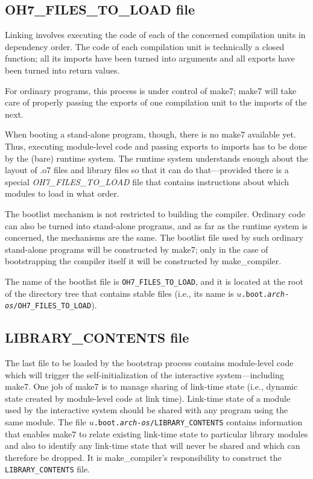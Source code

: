 \subsection{OH7_FILES_TO_LOAD file}

Linking involves executing the code of each of the
concerned compilation units in dependency order.  The code of each compilation unit is
technically a closed function; all its imports have been turned into
arguments and all exports have been turned into return values.

For ordinary programs, this process is under control of make7; make7 will
take care of properly passing the exports of one compilation unit to
the imports of the next.

When booting a stand-alone program, though, there is no make7 available
yet.  Thus, executing module-level code and passing exports to imports
has to be done by the (bare) runtime system.  The runtime system
understands enough about the layout of .o7 files and library files so
that it can do that---provided there is a special {\em OH7_FILES_TO_LOAD}
file that contains instructions about which modules to load in what
order.

The bootlist mechanism is not restricted to building the compiler.  Ordinary
code can also be turned into stand-alone programs, and as far as the
runtime system is concerned, the mechanisms are the same.  The
bootlist file used by such ordinary stand-alone programs will be
constructed by make7; only in the case of bootstrapping the compiler itself it
will be constructed by make_compiler.

The name of the bootlist file is {\tt OH7_FILES_TO_LOAD}, and it is located at
the root of the directory tree that contains stable files (i.e., its
name is {\tt $u$.boot.{\it arch}-{\it os}/OH7_FILES_TO_LOAD}).

\subsection{LIBRARY_CONTENTS file}

The last file to be loaded by the bootstrap process contains
module-level code which will trigger the self-initialization of the
interactive system---including make7.  One job of make7 is to manage sharing
of link-time state (i.e., dynamic state created by module-level code
at link time).  Link-time state of a module used by the interactive
system should be shared with any program using the same module.  The
file {\tt $u$.boot.{\it arch}-{\it os}/LIBRARY_CONTENTS} contains information
that enables make7 to relate existing link-time state to particular
library modules and also to identify any link-time state that will
never be shared and which can therefore be dropped.  It is make_compiler's
responsibility to construct the {\tt LIBRARY_CONTENTS} file.

